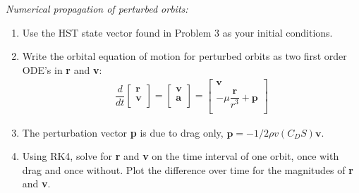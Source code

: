 \documentclass[onecolumn,10pt]{jhwhw}
\begin{document}
\clearpage
\problem{}
\textit{Numerical propagation of perturbed orbits:}
\begin{enumerate}
\item Use the HST state vector found in Problem 3 as your initial conditions.
\item Write the orbital equation of motion for perturbed orbits as two first order ODE’s in \textbf{r} and \textbf{v}:
\begin{align*}
\dfrac{d}{dt} \begin{bmatrix}
          \textbf{r} \\
          \textbf{v} \\
        \end{bmatrix}
  = \begin{bmatrix}
          \textbf{v} \\
          \textbf{a} \\
        \end{bmatrix}
  = \begin{bmatrix}
          \textbf{v} \\
          -\mu \dfrac{\textbf{r}}{r^3} + \textbf{p} \\
        \end{bmatrix}
\end{align*}
\item The perturbation vector \textbf{p} is due to drag only, $\textbf{p} = -1/2 \rho v(C_D S)\textbf{v}$.
\item Using RK4, solve for \textbf{r} and \textbf{v} on the time interval of one orbit, once with drag and once without. Plot the
difference over time for the magnitudes of \textbf{r} and \textbf{v}.
\end{enumerate}



% 
\end{document}
